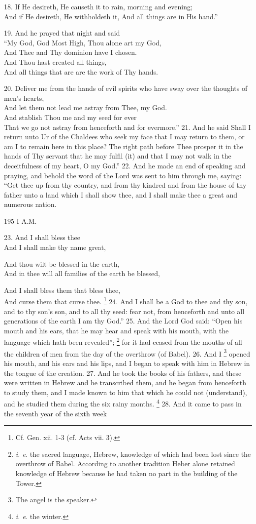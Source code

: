18. If He desireth, He causeth it to rain, morning and evening;\\
And if He desireth, He withholdeth it, And all things are in His hand.''

19. And he prayed that night and said\\
``My God, God Most High, Thou alone art my God,\\
And Thee and Thy dominion have I chosen.\\
And Thou hast created all things,\\
And all things that are are the work of Thy hands.

20. Deliver me from the hands of evil spirits who have sway over the thoughts of men's hearts,\\
And let them not lead me astray from Thee, my God.\\
And stablish Thou me and my seed for ever\\
That we go not astray from henceforth and for evermore.'' 21. And he said Shall I return unto Ur of the Chaldees who seek my face that I may return to them, or am I to remain here in this place? The right path before Thee prosper it in the hands of Thy servant that he may fulfil (it) and that I may not walk in the deceitfulness of my heart, O my God.'' 22. And he made an end of speaking and praying, and behold the word of the Lord was sent to him through me, saying: ``Get thee up from thy country, and from thy kindred and from the house of thy father unto a land which I shall show thee, and I shall make thee a great and numerous nation.

195 I A.M.

23. And I shall bless thee\\
And I shall make thy name great,

And thou wilt be blessed in the earth,\\
And in thee will all families of the earth be blessed,

And I shall bless them that bless thee,\\
And curse them that curse thee. \footnote{Cf. Gen. xii. 1-3 (cf. Acts vii. 3).} 24. And I shall be a God to thee and thy son, and to thy son's son, and to all thy seed: fear not, from henceforth and unto all generations of the earth I am thy God.'' 25. And the Lord God said: ``Open his mouth and his ears, that he may hear and speak with his mouth, with the language which hath been revealed''; \footnote{\emph{i. e.} the sacred language, Hebrew, knowledge of which had been lost since the overthrow of Babel. According to another tradition Heber alone retained knowledge of Hebrew because he had taken no part in the building of the Tower.} for it had ceased from the mouths of all the children of men from the day of the overthrow (of Babel). 26. And I \footnote{The angel is the speaker.} opened his mouth, and his ears and his lips, and I began to speak with him in Hebrew in the tongue of the creation. 27. And he took the books of his fathers, and these were written in Hebrew and he transcribed them, and he began from henceforth to study them, and I made known to him that which he could not (understand), and he studied them during the six rainy months. \footnote{\emph{i. e.} the winter.} 28. And it came to pass in the seventh year of the sixth week

